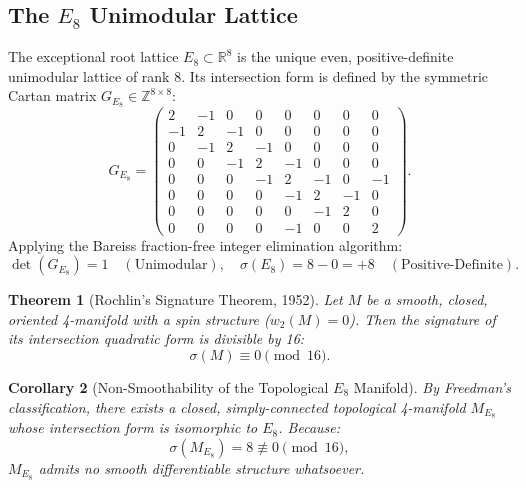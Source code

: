 \documentclass[11pt,reqno]{article}
\newtheorem{theorem}{Theorem}[section]
\newtheorem{corollary}[theorem]{Corollary}
\theoremstyle{definition}
\begin{document}
\subsection{The $E_8$ Unimodular Lattice}
The exceptional root lattice $E_8 \subset \mathbb{R}^8$ is the unique even, positive-definite unimodular lattice of rank 8. Its intersection form is defined by the symmetric Cartan matrix $G_{E_8} \in \mathbb{Z}^{8 \times 8}$:
\begin{equation}
G_{E_8} = \begin{pmatrix}
2 & -1 & 0 & 0 & 0 & 0 & 0 & 0 \\
-1 & 2 & -1 & 0 & 0 & 0 & 0 & 0 \\
0 & -1 & 2 & -1 & 0 & 0 & 0 & 0 \\
0 & 0 & -1 & 2 & -1 & 0 & 0 & 0 \\
0 & 0 & 0 & -1 & 2 & -1 & 0 & -1 \\
0 & 0 & 0 & 0 & -1 & 2 & -1 & 0 \\
0 & 0 & 0 & 0 & 0 & -1 & 2 & 0 \\
0 & 0 & 0 & 0 & -1 & 0 & 0 & 2
\end{pmatrix}.
\end{equation}
Applying the Bareiss fraction-free integer elimination algorithm:
\begin{equation}
\det(G_{E_8}) = 1 \quad (\text{Unimodular}), \quad \sigma(E_8) = 8 - 0 = +8 \quad (\text{Positive-Definite}).
\end{equation}

\begin{theorem}[Rochlin's Signature Theorem, 1952]
Let $M$ be a smooth, closed, oriented 4-manifold with a spin structure ($w_2(M) = 0$). Then the signature of its intersection quadratic form is divisible by 16:
\begin{equation}
\sigma(M) \equiv 0 \pmod{16}.
\end{equation}
\end{theorem}

\begin{corollary}[Non-Smoothability of the Topological $E_8$ Manifold]
By Freedman's classification, there exists a closed, simply-connected topological 4-manifold $M_{E_8}$ whose intersection form is isomorphic to $E_8$. Because:
\begin{equation}
\sigma(M_{E_8}) = 8 \not\equiv 0 \pmod{16},
\end{equation}
$M_{E_8}$ admits no smooth differentiable structure whatsoever.
\end{corollary}
\end{document}

